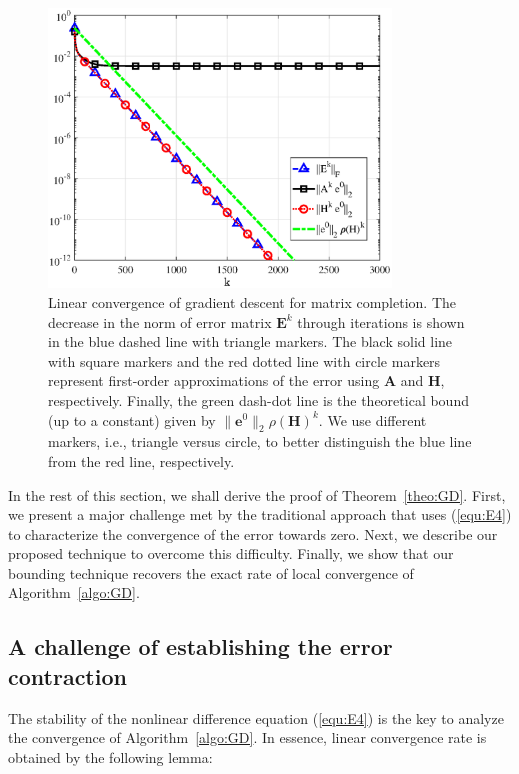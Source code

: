 \documentclass{article}
\newcommand{\hlnew}[1]{{#1}}
\newcommand{\norm}[1]{\|#1\|} %
\begin{document}
\begin{figure}[t]
  \centering
  \centerline{\includegraphics[width=9.1cm]{fig1_revised}}
  \caption{Linear convergence of gradient descent for matrix completion. \hlnew{The decrease in the norm of error matrix $\bm E^k$ through iterations is shown in the blue dashed line with triangle markers. The black solid line with square markers and the red dotted line with circle markers represent first-order approximations of the error using $\bm A$ and $\bm H$, respectively. Finally, the green dash-dot line is the theoretical bound (up to a constant) given by $\norm{\bm e^0}_2 \rho(\bm H)^k$. We use different markers, i.e., triangle versus circle, to better distinguish the blue line from the red line, respectively.}}
	\label{fig1} 
\vspace{-9pt}
\end{figure}

In the rest of this section, we shall derive the proof of Theorem~\ref{theo:GD}. First, we present a major challenge met by the traditional approach that uses (\ref{equ:E4}) to characterize the convergence of the error towards zero. Next, we describe our proposed technique to overcome \hlnew{this difficulty. Finally, we show that our bounding technique recovers the exact rate of local convergence of Algorithm}~\ref{algo:GD}.  





\vspace{-5pt}
\subsection{A challenge of establishing the error contraction}
\label{subsec:challenge}
The stability of the nonlinear difference equation (\ref{equ:E4}) is the key to analyze the convergence of Algorithm~\ref{algo:GD}. In essence, linear convergence rate is obtained by the following lemma:
\end{document}
